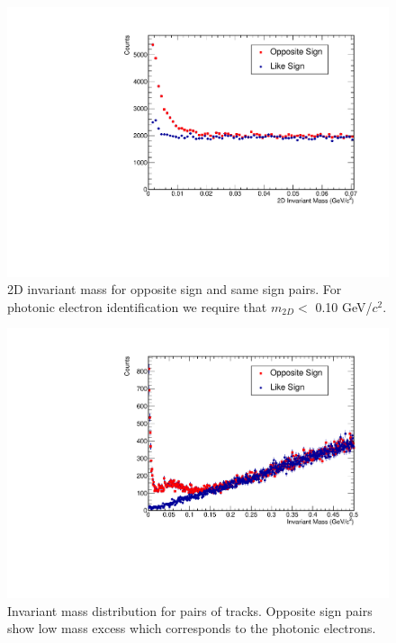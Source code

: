 \begin{figure}[htbp]
\begin{center}
\includegraphics[scale=.75]{Plots/NPE/2DInvMass_OS_LS.pdf}
\end{center}
\caption[2D Invariant Mass]{2D invariant mass for opposite sign and same sign pairs. For photonic electron identification we require that $m_{2D} <$ 0.10 GeV/$c^2$.}
\label{fig:2DInvMass}
\end{figure}

\begin{figure}[htbp]
\begin{center}
\includegraphics[scale=.75]{Plots/NPE/InvMass_OS_LS.pdf}
\end{center}
\caption[Invariant Mass]{Invariant mass distribution for pairs of tracks. Opposite sign pairs show low mass excess which corresponds to the photonic electrons.}
\label{fig:InvMass}
\end{figure}

